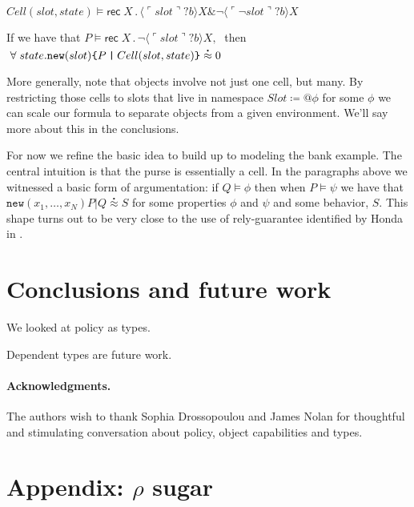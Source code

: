 \documentclass[]{amsart}
\newcommand{\lpquote}{\ulcorner}
\newcommand{\rpquote}{\urcorner}
\newcommand{\id}[1]{\texttt{#1}}
\newcommand{\juxtap}{\mathbin{\id{|}}}
\newcommand{\binpar}[2]{#1 \juxtap #2}
\newcommand{\defneqls}{\coloneqq}
\newcommand{\wbbisim}{\stackrel{\centerdot}{\approx}} %
\newcommand{\pquotep}[1]{\lpquote #1 \rpquote}
\newcommand{\pprefix}[3]{\langle #1 ? #2 \rangle #3}
\newcommand{\pgfp}[2]{\textsf{rec} \; #1 \mathbin{.} #2}
\theoremstyle{definition}
\theoremstyle{remark}
\numberwithin{equation}{subsection}
\begin{document}
$Cell (slot, state) \models 
\pgfp{X}{\pprefix{\pquotep{slot}}{b}{X} \& 
\neg \pprefix{\pquotep{\neg slot}}{b}{X}}$

If we have that $P \models \pgfp{X}{\neg
  \pprefix{\pquotep{slot}}{b}{X}}, \;$ then
$\; \forall \; state . \mbox{\tt new}(slot)\mbox{\tt \{}
\binpar{P}{Cell(slot, state)} \mbox{\tt \}}\wbbisim 0$

More generally, note that objects involve not just one cell, but
many. By restricting those cells to slots that live in namespace $Slot
\defneqls {@}\phi$ for some $\phi$ we can scale our formula to
separate objects from a given environment. We'll say more about this
in the conclusions. 

For now we refine the basic idea to build up to modeling the bank
example. The central intuition is that the purse is essentially a
cell. In the paragraphs above we witnessed a basic form of argumentation: if $Q
\models \phi$ then when $P \models \psi$ we have that
$\texttt{new}(x_1,\ldots,x_N)\binpar{P}{Q} \wbbisim S$ for some properties
$\phi$ and $\psi$ and some behavior, $S$. This shape turns out to be
very close to the use of rely-guarantee identified by Honda in
\cite{Honda:2008:UTP:2227536.2227558}.

\section{Conclusions and future work}

We looked at policy as types.

Dependent types are future work.

\paragraph{Acknowledgments.}
The authors wish to thank Sophia Drossopoulou and James Nolan for
thoughtful and stimulating conversation about policy, object
capabilities and types.





\section{Appendix: $\rho$ sugar}
\end{document}
